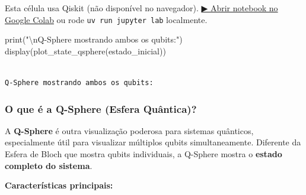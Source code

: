\documentclass[
  brazilian,
]{report}
\newenvironment{Shaded}{\begin{snugshade}}{\end{snugshade}}
\newcommand{\BuiltInTok}[1]{\textcolor[rgb]{0.00,0.23,0.31}{#1}}
\newcommand{\CharTok}[1]{\textcolor[rgb]{0.13,0.47,0.30}{#1}}
\newcommand{\NormalTok}[1]{\textcolor[rgb]{0.00,0.23,0.31}{#1}}
\newcommand{\StringTok}[1]{\textcolor[rgb]{0.13,0.47,0.30}{#1}}
\begin{document}
\begin{tcolorbox}[enhanced jigsaw, arc=.35mm, bottomrule=.15mm, bottomtitle=1mm, breakable, colback=white, colbacktitle=quarto-callout-warning-color!10!white, colframe=quarto-callout-warning-color-frame, coltitle=black, left=2mm, leftrule=.75mm, opacityback=0, opacitybacktitle=0.6, rightrule=.15mm, title=\textcolor{quarto-callout-warning-color}{\faExclamationTriangle}\hspace{0.5em}{⚛️ Célula Qiskit --- execute no Colab ou localmente}, titlerule=0mm, toprule=.15mm, toptitle=1mm]

Esta célula usa Qiskit (não disponível no navegador).
\href{https://colab.research.google.com/github/maxwellamaral/aula-quantum/blob/main/notebooks/05-interference.ipynb}{▶
Abrir notebook no Google Colab} ou rode \texttt{uv\ run\ jupyter\ lab}
localmente.

\begin{Shaded}
\begin{Highlighting}[]


\BuiltInTok{print}\NormalTok{(}\StringTok{"}\CharTok{\textbackslash{}n}\StringTok{Q{-}Sphere mostrando ambos os qubits:"}\NormalTok{)}
\NormalTok{display(plot\_state\_qsphere(estado\_inicial))}
\end{Highlighting}
\end{Shaded}

\end{tcolorbox}

\begin{verbatim}

Q-Sphere mostrando ambos os qubits:
\end{verbatim}

\subsubsection{O que é a Q-Sphere (Esfera
Quântica)?}\label{o-que-uxe9-a-q-sphere-esfera-quuxe2ntica}

A \textbf{Q-Sphere} é outra visualização poderosa para sistemas
quânticos, especialmente útil para visualizar múltiplos qubits
simultaneamente. Diferente da Esfera de Bloch que mostra qubits
individuais, a Q-Sphere mostra o \textbf{estado completo do sistema}.

\textbf{Características principais:}
\end{document}
